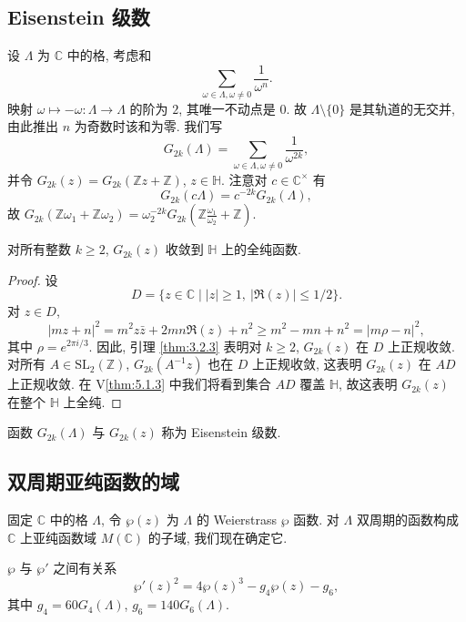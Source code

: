\subsection*{Eisenstein 级数}

设 $\Lambda$ 为 $\mathbb{C}$ 中的格, 考虑和
\[
\sum\limits_{\omega\in\Lambda, \omega\neq 0}\frac{1}{\omega^n}.
\]
映射 $\omega\mapsto-\omega\colon\Lambda\to\Lambda$ 的阶为 $2$, 其唯一不动点是 $0$. 故 $\Lambda\setminus\{0\}$ 是其轨道的无交并, 由此推出 $n$ 为奇数时该和为零. 我们写
\[
G_{2k}(\Lambda) = \sum\limits_{\omega\in\Lambda, \omega\neq 0}\frac{1}{\omega^{2k}},
\]
并令 $G_{2k}(z) = G_{2k}(\mathbb{Z}z + \mathbb{Z})$, $z\in\mathbb{H}$. 注意对 $c\in\mathbb{C}^{\times}$ 有
\[
G_{2k}(c\Lambda) = c^{-2k}G_{2k}(\Lambda),
\]
故 $G_{2k}(\mathbb{Z}\omega_1 + \mathbb{Z}\omega_2) = \omega_2^{-2k}G_{2k}(\mathbb{Z}\frac{\omega_1}{\omega_2} + \mathbb{Z})$.

\begin{proposition} \label{thm:3.2.5} 
对所有整数 $k\ge 2$, $G_{2k}(z)$ 收敛到 $\mathbb{H}$ 上的全纯函数.
\end{proposition}

\begin{proof}
设
\[
D = \{z\in\mathbb{C} \mid |z|\ge 1, \ |\Re(z)|\le 1/2\}.
\]
对 $z\in D$,
\[
|mz + n|^2 = m^2z\bar{z} + 2mn\Re(z) + n^2\ge m^2 - mn + n^2 = |m\rho - n|^2,
\]
其中 $\rho = e^{2\pi i/3}$. 因此, 引理 \ref{thm:3.2.3} 表明对 $k\ge 2$, $G_{2k}(z)$ 在 $D$ 上正规收敛. 对所有 $A\in\mathrm{SL}_2(\mathbb{Z})$, $G_{2k}(A^{-1}z)$ 也在 $D$ 上正规收敛, 这表明 $G_{2k}(z)$ 在 $AD$ 上正规收敛. 在 V\ref{thm:5.1.3} 中我们将看到集合 $AD$ 覆盖 $\mathbb{H}$, 故这表明 $G_{2k}(z)$ 在整个 $\mathbb{H}$ 上全纯.
\end{proof}

函数 $G_{2k}(\Lambda)$ 与 $G_{2k}(z)$ 称为 Eisenstein 级数.

\subsection*{双周期亚纯函数的域}

固定 $\mathbb{C}$ 中的格 $\Lambda$, 令 $\wp(z)$ 为 $\Lambda$ 的 Weierstrass $\wp$ 函数. 对 $\Lambda$ 双周期的函数构成 $\mathbb{C}$ 上亚纯函数域 $M(\mathbb{C})$ 的子域, 我们现在确定它.

\begin{proposition} \label{thm:3.2.6} 
$\wp$ 与 $\wp'$ 之间有关系
\[
\wp'(z)^2 = 4\wp(z)^3 - g_4\wp(z) - g_6,
\]
其中 $g_4 = 60G_4(\Lambda)$, $g_6 = 140G_6(\Lambda)$.
\end{proposition}

